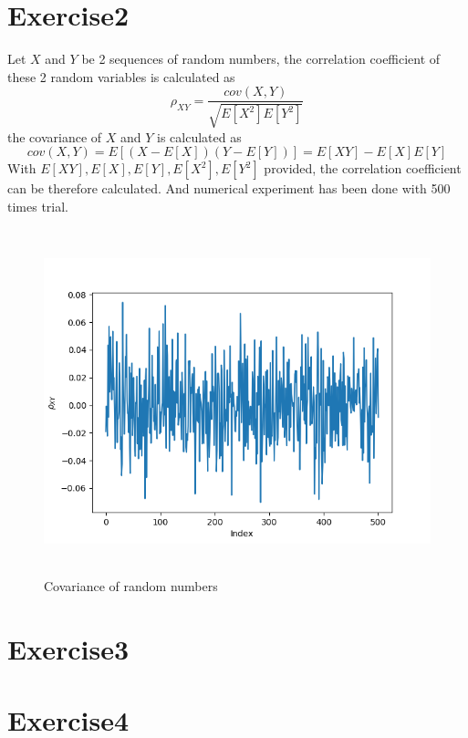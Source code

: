 \documentclass[paper=a4, fontsize=11pt]{scrartcl} %
\numberwithin{equation}{section} %
\numberwithin{figure}{section} %
\numberwithin{table}{section} %
\begin{document}
\section{Exercise2}
  Let $X$ and $Y$ be 2 sequences of random numbers, the correlation coefficient of these 2 random variables is calculated as
  \begin{equation}
  	\rho_{XY} = \frac{cov(X, Y)}{\sqrt{E[X^2] E[Y^2]}}
  \end{equation}
  the covariance of $X$ and $Y$ is calculated as
  \begin{equation}
  	cov(X, Y) = E[(X-E[X])(Y-E[Y])] = E[XY] - E[X]E[Y]
  \end{equation}
  With $E[XY], E[X], E[Y], E[X^2], E[Y^2]$ provided, the correlation coefficient can be therefore calculated. And
  numerical experiment has been done with 500 times trial.
   \begin{figure}[H]
	  	\centering
	  	\includegraphics[height=10cm]{CovPlot.png}
	  	\caption{Covariance of random numbers}
	  	\label{img:cov}
  	\end{figure}
\section{Exercise3}

\section{Exercise4}
\end{document}
